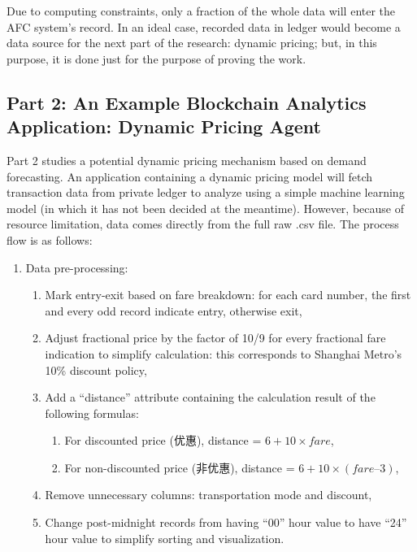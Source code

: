 \documentclass[a4paper,12pt,oneside, utf8x]{report}
\begin{document}
\begin{enumerate}

Due to computing constraints, only a fraction of the whole data will enter the AFC system’s record. In an ideal case, recorded data in ledger would become a data source for the next part of the research: dynamic pricing; but, in this purpose, it is done just for the purpose of proving the work.

\subsection{Part 2: An Example Blockchain Analytics Application: Dynamic Pricing Agent}

Part 2 studies a potential dynamic pricing mechanism based on demand forecasting. An application containing a dynamic pricing model will fetch transaction data from private ledger to analyze using a simple machine learning model (in which it has not been decided at the meantime). However, because of resource limitation, data comes directly from the full raw .csv file. The process flow is as follows:

\begin{enumerate}
\item Data pre-processing:
\begin{enumerate}
\item Mark entry-exit based on fare breakdown: for each card number, the first and every odd record indicate entry, otherwise exit, 
\item Adjust fractional price by the factor of 10/9 for every fractional fare indication to simplify calculation: this corresponds to Shanghai Metro’s 10\% discount policy,
\item Add a “distance” attribute containing the calculation result of the following formulas:
\begin{enumerate}
\item For discounted price (优惠), distance = $6 +10 \times fare$,
\item For non-discounted price (非优惠), distance = $6 +10 \times (fare – 3)$,
\end{enumerate}
\item Remove unnecessary columns: transportation mode and discount,
\item Change post-midnight records from having “00” hour value to have “24” hour value to simplify sorting and visualization.
\end{enumerate}


\end{enumerate}
\end{enumerate}
\end{document}
